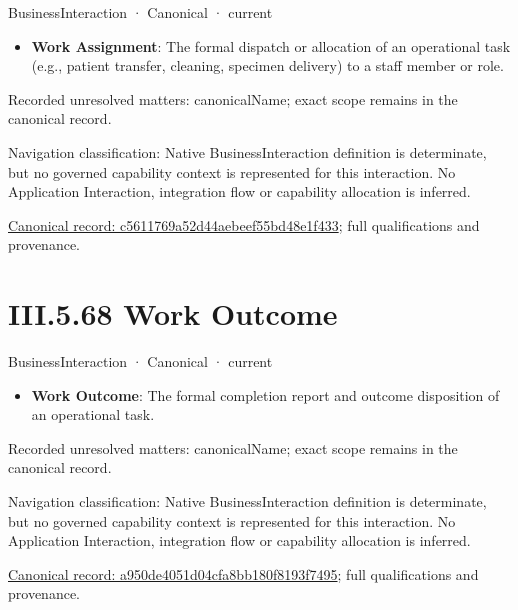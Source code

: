 \label{element:c5611769a52d44aebeef55bd48e1f433}
{\small BusinessInteraction · Canonical · current}\par

\begin{itemize}


\item \textbf{Work Assignment}: The formal dispatch or allocation of an operational task (e.g., patient transfer, cleaning, specimen delivery) to a staff member or role.

\end{itemize}

{\small Recorded unresolved matters: canonicalName; exact scope remains in the canonical record.}\par
{\small Navigation classification: Native BusinessInteraction definition is determinate, but no governed capability context is represented for this interaction. No Application Interaction, integration flow or capability allocation is inferred.}\par
{\footnotesize \href{../../../../../../../../continuum/business/business-interaction/c5611769a52d44aebeef55bd48e1f433.md}{Canonical record: c5611769a52d44aebeef55bd48e1f433}; full qualifications and provenance.}\par
\section*{III.5.68 Work Outcome}
\label{navigation:III.5.68}

\label{element:a950de4051d04cfa8bb180f8193f7495}
{\small BusinessInteraction · Canonical · current}\par

\begin{itemize}


\item \textbf{Work Outcome}: The formal completion report and outcome disposition of an operational task.

\end{itemize}

{\small Recorded unresolved matters: canonicalName; exact scope remains in the canonical record.}\par
{\small Navigation classification: Native BusinessInteraction definition is determinate, but no governed capability context is represented for this interaction. No Application Interaction, integration flow or capability allocation is inferred.}\par
{\footnotesize \href{../../../../../../../../continuum/business/business-interaction/a950de4051d04cfa8bb180f8193f7495.md}{Canonical record: a950de4051d04cfa8bb180f8193f7495}; full qualifications and provenance.}\par
